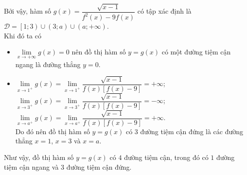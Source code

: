 \begin{ex}
{{\begin{itemize}
            \end{itemize}
        }
        {}
        \noindent
        Bởi vậy, hàm số $g(x)=\dfrac{\sqrt{x-1}}{f^2(x)-9f(x)}$ có tập xác định là $\mathscr D=\left[1;3\right) \cup \left(3;a\right) \cup\left( a;+\infty\right)$.\\
        Khi đó ta có
        \begin{itemize}
            \item $\lim\limits_{x\to+\infty}g(x)=0$ nên đồ thị hàm số $y=g(x)$ có một đường tiệm cận ngang là đường thẳng $y=0$.
            \item $\lim\limits_{x\to 1^+}g(x)=\lim\limits_{x\to 1^+}\dfrac{\sqrt{x-1}}{f(x)\left[f(x)-9\right] }=+\infty$;\\
            $\lim\limits_{x\to 3^+}g(x)=\lim\limits_{x\to 3^+}\dfrac{\sqrt{x-1}}{f(x)\left[f(x)-9\right] }=-\infty$;\\
            $\lim\limits_{x\to a^+}g(x)=\lim\limits_{x\to a^+}\dfrac{\sqrt{x-1}}{f(x)\left[f(x)-9\right] }=+\infty$.\\
            Do đó nên đồ thị hàm số $y=g(x)$ có $3$ đường tiệm cận đứng là các đường thẳng $x=1$, $x=3$ và $x=a$.
        \end{itemize}
        Như vậy, đồ thị hàm số $y=g(x)$ có $4$ đường tiệm cận, trong đó có $1$ đường tiệm cận ngang và $3$ đường tiệm cận đứng.
    }
\end{ex}
